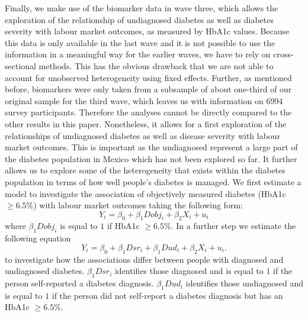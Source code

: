 Finally, we make use of the biomarker data in wave three, which allows
the exploration of the relationship of undiagnosed diabetes as well
as diabetes severity with labour market outcomes, as measured by \ac{HbA1c}
values. Because this data is only available in the last wave and it
is not possible to use the information in a meaningful way for the
earlier waves, we have to rely on cross-sectional methods. This has the
obvious drawback that we are not able to account for unobserved
heterogeneity using fixed effects. Further, as mentioned before, biomarkers
were only taken from a subsample of about one-third of our original sample
for the third wave, which leaves us with information on 6994 survey
participants. Therefore the analyses cannot be directly compared to
the other results in this paper. Nonetheless, it allows for a first
exploration of the relationships of undiagnosed diabetes as well as
disease severity with labour market outcomes. This is important as
the undiagnosed represent a large part of the diabetes population
in Mexico which has not been explored so far. It further allows us
to explore some of the heterogeneity that exists within the diabetes
population in terms of how well people's diabetes is managed. We first estimate a model to investigate the association of objectively measured diabetes (HbA1c $\geq6.5\%$) with labour market outcomes taking the following form:
\noindent 
\begin{equation}
Y_{i}=\beta_{0}+\beta_{1}Dobj_{i}+\beta_{2}X_{i}+u_{i}\label{eq:diab_objective}
\end{equation}
where $\beta_{1}Dobj_{i}$ is equal to $1$ if HbA1c $\geq6.5\%$.
In a further step we estimate the following equation
\noindent 
\begin{equation}
Y_{i}=\beta_{0}+\beta_{1}Dsr_{i}+\beta_{1}Dud_{i}+\beta_{2}X_{i}+u_{i}.\label{eq:diab_sr_ud}
\end{equation}
to investigate how the associations differ between people with diagnosed and undiagnosed diabetes. $\beta_{1}Dsr_{i}$ identifies those diagnosed and is equal to $1$ if the person self-reported a diabetes diagnosis.  $\beta_{1}Dud_{i}$ identifies those undiagnosed and is equal to $1$ if the person did not self-report a diabetes diagnosis but has an HbA1c $\geq6.5\%$.
  
  
  
  
  
  